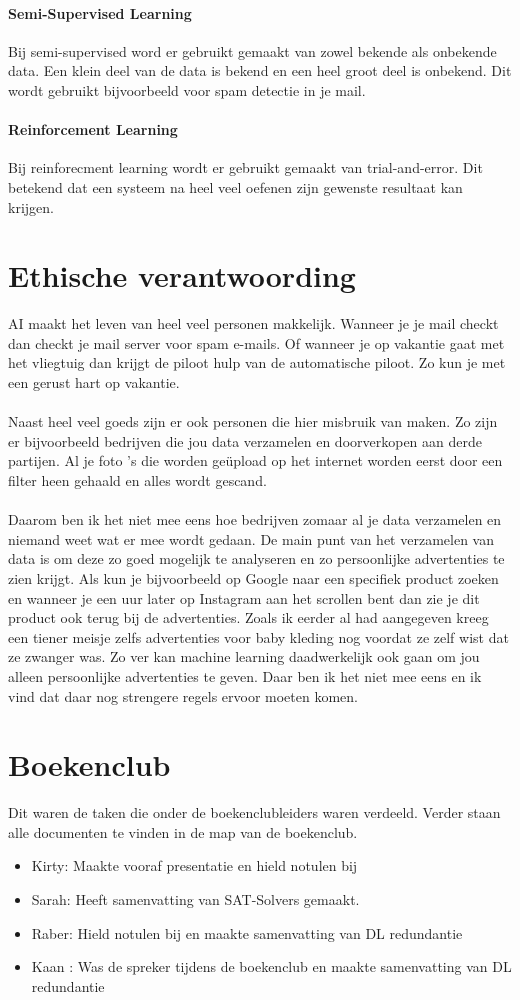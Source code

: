\documentclass{article}
\begin{document}
\paragraph{Semi-Supervised Learning}
Bij semi-supervised word er gebruikt gemaakt van zowel bekende als onbekende data. Een klein deel van de data is bekend en een heel groot deel is onbekend. Dit wordt gebruikt bijvoorbeeld voor spam detectie in je mail.
\paragraph{Reinforcement Learning}
Bij reinforecment learning wordt er gebruikt gemaakt van trial-and-error. Dit betekend dat een systeem na heel veel oefenen zijn gewenste resultaat kan krijgen.
\section{Ethische verantwoording}
AI maakt het leven van heel veel personen makkelijk. Wanneer je je mail checkt dan checkt je mail server voor spam e-mails. Of wanneer je op vakantie gaat met het vliegtuig dan krijgt de piloot hulp van de automatische piloot. Zo kun je met een gerust hart op vakantie. 
\\\\
Naast heel veel goeds zijn er ook personen die hier misbruik van maken. Zo zijn er bijvoorbeeld bedrijven die jou data verzamelen en doorverkopen aan derde partijen. Al je foto 's die worden geüpload op het internet worden eerst door een filter heen gehaald en alles wordt gescand. 
\\\\
Daarom ben ik het niet mee eens hoe bedrijven zomaar al je data verzamelen en niemand weet wat er mee wordt gedaan. De main punt van het verzamelen van data is om deze zo goed mogelijk te analyseren en zo persoonlijke advertenties te zien krijgt. Als kun je bijvoorbeeld op Google naar een specifiek product zoeken en wanneer je een uur later op Instagram aan het scrollen bent dan zie je dit product ook terug bij de advertenties. Zoals ik eerder al had aangegeven kreeg een tiener meisje zelfs advertenties voor baby kleding nog voordat ze zelf wist dat ze zwanger was. Zo ver kan machine learning daadwerkelijk ook gaan om jou alleen persoonlijke advertenties te geven. Daar ben ik het niet mee eens en ik vind dat daar nog strengere regels ervoor moeten komen.
\section{Boekenclub}
Dit waren de taken die onder de boekenclubleiders waren verdeeld. Verder staan alle documenten te vinden in de map van de boekenclub.
\begin{itemize}
    \item Kirty: Maakte vooraf presentatie en hield notulen bij
    \item Sarah: Heeft samenvatting van SAT-Solvers gemaakt.
    \item Raber: Hield notulen bij en maakte samenvatting van DL redundantie
    \item Kaan : Was de spreker tijdens de boekenclub en maakte samenvatting van DL redundantie
\end{itemize}
\end{document}
